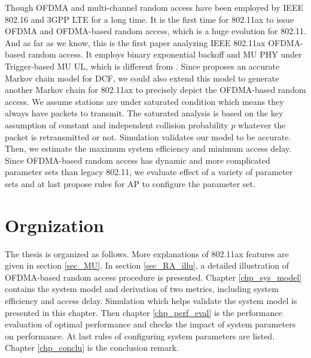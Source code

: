 Though OFDMA and multi-channel random access have been employed by IEEE 802.16 and 3GPP LTE for a long time.
It is the first time for 802.11ax to issue OFDMA and OFDMA-based random access, which is a huge evolution for 802.11.
And as far as we know, this is the first paper analyzing IEEE 802.11ax OFDMA-based random access. 
It employs binary exponential backoff and MU PHY under Trigger-based MU UL, which is different from \cite{GeneralizedOFDMACSMACA}.
Since \cite{bianchi2000performance} proposes an accurate Markov chain model for DCF, we could also extend this model to generate another Markov chain for 802.11ax to precisely depict the OFDMA-based random access.
We assume stations are under saturated condition which means they always have packets to transmit.
The saturated analysis is based on the key assumption of constant and independent collision probability $p$ whatever the packet is retransmitted or not.
Simulation validates our model to be accurate.
Then, we estimate the maximum system efficiency and minimum access delay. 
Since OFDMA-based random access has dynamic and more complicated parameter sets than legacy 802.11, we evaluate effect of a variety of parameter sets and at last propose rules for AP to configure the parameter set. 


\section{Orgnization}

The thesis is organized as follows. 
More explanations of 802.11ax features are given in section \ref{sec_MU}. In section \ref{sec_RA_illu}, a detailed illustration of OFDMA-based random access procedure is presented.
Chapter \ref{chp_sys_model} contains the system model and derivation of two metrics, including system efficiency and access delay. 
Simulation which helps validate the system model is presented in this chapter.
Then chapter \ref{chp_perf_eval} is the performance evaluation of optimal performance and checks the impact of system parameters on performance.
At last rules of configuring system parameters are listed.
Chapter \ref{chp_conclu} is the conclusion remark.

%
%
%
